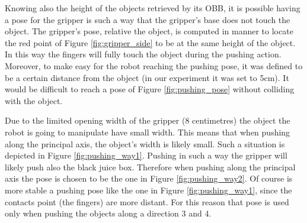 Knowing also the height of the objects retrieved by its OBB, it is possible having a pose for the gripper is such a way that the gripper's base does not touch the object. The gripper's pose, relative the object, is computed in manner to locate the red point of Figure \ref{fig:gripper_side} to be at the same height of the object. In this way the fingers will fully touch the object during the pushing action. Moreover, to make easy for the robot reaching the pushing pose, it was defined to be a certain distance from the object (in our experiment it was set to 5cm). It would be difficult to reach a pose of Figure \ref{fig:pushing_pose} without colliding with the object.  

Due to the limited opening width of the gripper (8 centimetres) the object the robot is going to manipulate have small width. This means that when pushing along the principal axis, the object's width is likely small. Such a situation is depicted in Figure \ref{fig:pushing_way1}. Pushing in such a way the gripper will likely push also the black juice box. Therefore when pushing along the principal axis the pose is chosen to be the one in Figure \ref{fig:pushing_way2}. Of course is more stable a pushing pose like the one in Figure \ref{fig:pushing_way1}, since the contacts point (the fingers) are more distant. For this reason that pose is used only when pushing the objects along a direction 3 and 4.

